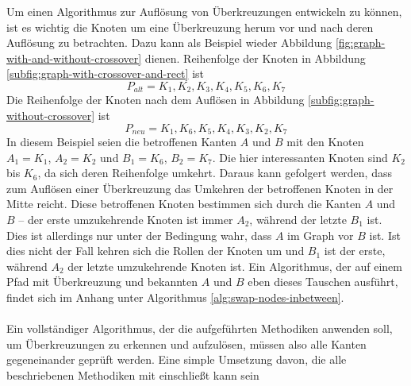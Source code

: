 Um einen Algorithmus zur Auflösung von Überkreuzungen entwickeln zu können, ist es wichtig die Knoten um eine Überkreuzung herum vor und nach deren Auflösung zu betrachten.
Dazu kann als Beispiel wieder Abbildung \vref{fig:graph-with-and-without-crossover} dienen.
Reihenfolge der Knoten in Abbildung \vref{subfig:graph-with-crossover-and-rect} ist $$P_{alt} = K_1, K_2, K_3, K_4, K_5, K_6, K_7$$
Die Reihenfolge der Knoten nach dem Auflösen in Abbildung \vref{subfig:graph-without-crossover} ist $$P_{neu} = K_1, K_6, K_5, K_4, K_3, K_2, K_7$$
In diesem Beispiel seien die betroffenen Kanten $A$ und $B$ mit den Knoten $A_1 = K_1$, $A_2 = K_2$ und $B_1 = K_6$, $B_2 = K_7$.
Die hier interessanten Knoten sind $K_2$ bis $K_6$, da sich deren Reihenfolge umkehrt.
Daraus kann gefolgert werden, dass zum Auflösen einer Überkreuzung das Umkehren der betroffenen Knoten in der Mitte reicht.
Diese betroffenen Knoten bestimmen sich durch die Kanten $A$ und $B$ -- der erste umzukehrende Knoten ist immer $A_2$, während der letzte $B_1$ ist.
Dies ist allerdings nur unter der Bedingung wahr, dass $A$ im Graph vor $B$ ist.
Ist dies nicht der Fall kehren sich die Rollen der Knoten um und $B_1$ ist der erste, während $A_2$ der letzte umzukehrende Knoten ist.
Ein Algorithmus, der auf einem Pfad mit Überkreuzung und bekannten $A$ und $B$ eben dieses Tauschen ausführt, findet sich im Anhang unter Algorithmus \vref{alg:swap-nodes-inbetween}.
\\\\
Ein vollständiger Algorithmus, der die aufgeführten Methodiken anwenden soll, um Überkreuzungen zu erkennen und aufzulösen, müssen also alle Kanten gegeneinander geprüft werden.
Eine simple Umsetzung davon, die alle beschriebenen Methodiken mit einschließt kann sein
